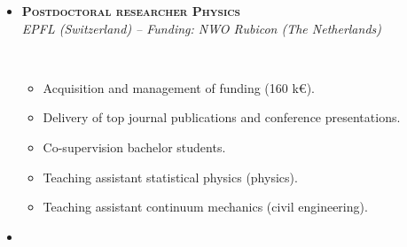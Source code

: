 \documentclass[11pt, a4paper]{article}
\newcommand{\dates}[1]{\hfill\mbox{\textbf{#1}}} %
\newcommand{\smaller}[1]{{\small\ #1}}
\begin{document}
\begin{minipage}[t]{0.56\textwidth}
\begin{itemize}
{\begin{itemize}
                \item Supervised bachelor, master and PhD researchers.
                \item Managed project planning, budgets and deliverables.
                \item Conducted internationally recognised research.
                \item Subjects: tribology, fracture, earthquakes, glasses, complex systems.
                \item Proposal of a novel, interdisciplinary, theory of friction.
                \item Delivery of top journal publications and conference presentations.
                \item Design, implementation, execution high-performance computations.
                \item Reviews for top journals.
                \item Data-champion.
            \end{itemize}
        }
        \vspace*{0.2eM}
        \item
        \textbf{\textsc{Postdoctoral researcher Physics}} \dates{\MyDateRubicon}
        \vspace*{0.1eM}
        \\
        \textit{EPFL (Switzerland) -- Funding: NWO Rubicon (The Netherlands)}
        \vspace*{0.2eM}
        \smaller{%
            \begin{itemize}
                \item Acquisition and management of funding (160 k\euro).
                \item Delivery of top journal publications and conference presentations.
                \item Co-supervision bachelor students.
                \item Teaching assistant statistical physics (physics).
                \item Teaching assistant continuum mechanics (civil engineering).
            \end{itemize}
        }
        \vspace*{0.2eM}
        \item

\end{itemize}
\end{minipage}
\end{document}
